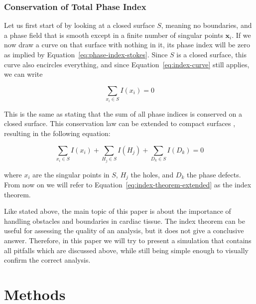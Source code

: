 \documentclass[twocolumn]{article}
\begin{document}
\subsubsection{Conservation of Total Phase Index}\label{sec:conservation-of-total-phase-index}

Let us first start of by looking at a closed surface $S$, meaning no boundaries,
and a phase field that is smooth except in a finite number of singular points $\bm{x}_i$.
If we now draw a curve on that surface with nothing in it,
its phase index will be zero as implied by Equation~\ref{eq:phase-index-stokes}.
Since \(S\) is a closed surface, this curve also encircles everything,
and since Equation~\ref{eq:index-curve} still applies,
we can write

\begin{equation}
  \sum_{x_i \in S} I(x_i) = 0
  \label{eq:index-theorem}
\end{equation}

\noindent This is the same as stating that the sum of all phase indices is
conserved on a closed surface.
This conservation law can be extended to compact surfaces \autocite{herlin2012reconstruction, davidsen2004topological},
resulting in the following equation:

\begin{equation}
  \sum_{x_i \in S} I(x_i) + \sum_{H_j \in S} I(H_j) + \sum_{D_k \in S} I(D_k)  = 0
  \label{eq:index-theorem-extended}
\end{equation}

\noindent where \(x_i\) are the singular points in \(S\),
\(H_j\) the holes,
and \(D_k\) the phase defects.
From now on we will refer to Equation~\ref{eq:index-theorem-extended} as the index theorem.

\vspace{2em}

\noindent Like stated above, the main topic of this paper is about the importance
of handling obstacles and boundaries in cardiac tissue.
The index theorem can be useful for assessing the quality of an analysis,
but it does not give a conclusive answer.
Therefore, in this paper we will try to present a simulation
that contains all pitfalls which are discussed above,
while still being simple enough to visually confirm the correct analysis.

\section{Methods}
\end{document}
